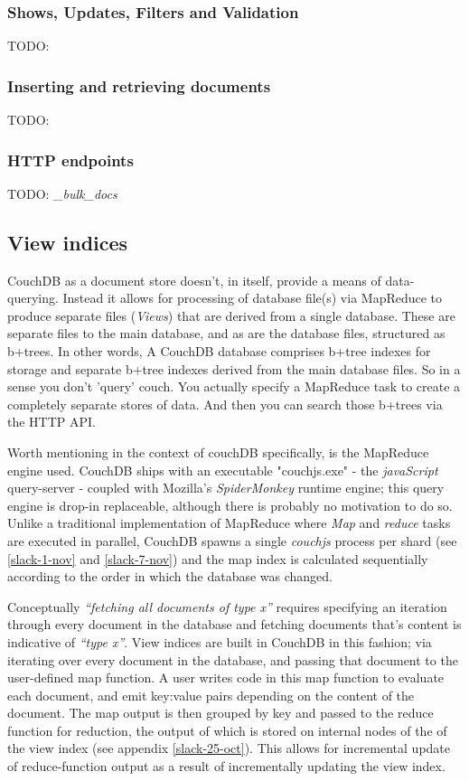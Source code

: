 \subsubsection{Shows, Updates, Filters and Validation}
TODO:

\subsubsection{Inserting and retrieving documents}
TODO:


\subsubsection{HTTP endpoints}
TODO: \textit{\_bulk\_docs}



\subsection{View indices}
CouchDB as a document store doesn't, in itself, provide a means of data-querying. Instead it allows for processing of database file(s) via MapReduce to produce separate files (\textit{Views}) that are derived from a single database. These are separate files to the main database, and as are the database files, structured as b+trees. In other words, A CouchDB database comprises b+tree indexes for storage and separate b+tree indexes derived from the main database files. So in a sense you don’t 'query' couch. You actually specify a MapReduce task to create a completely separate stores of data. And then you can search those b+trees via the HTTP API.

Worth mentioning in the context of couchDB specifically, is the MapReduce engine used. CouchDB ships with an executable "couchjs.exe" - the \textit{javaScript} query-server - coupled with Mozilla's \textit{SpiderMonkey} runtime engine; this query engine is drop-in replaceable, although there is probably no motivation to do so. Unlike a traditional implementation of MapReduce where \textit{Map} and \textit{reduce} tasks are executed in parallel, CouchDB spawns a single \textit{couchjs} process per shard (see \ref{slack-1-nov} and \ref{slack-7-nov}) and the map index is calculated sequentially according to the order in which the database was changed.

Conceptually \textit{``fetching all documents of type x''} requires specifying an iteration through every document in the database and fetching documents that's content is indicative of \textit{``type x''}. View indices are built in CouchDB in this fashion; via iterating over every document in the database, and passing that document to the user-defined map function. A user writes code in this map function to evaluate each document, and emit key:value pairs depending on the content of the document. The map output is then grouped by key and passed to the reduce function for reduction, the output of which is stored on internal nodes of the of the view index (see appendix \ref{slack-25-oct}). This allows for incremental update of reduce-function output as a result of incrementally updating the view index.

